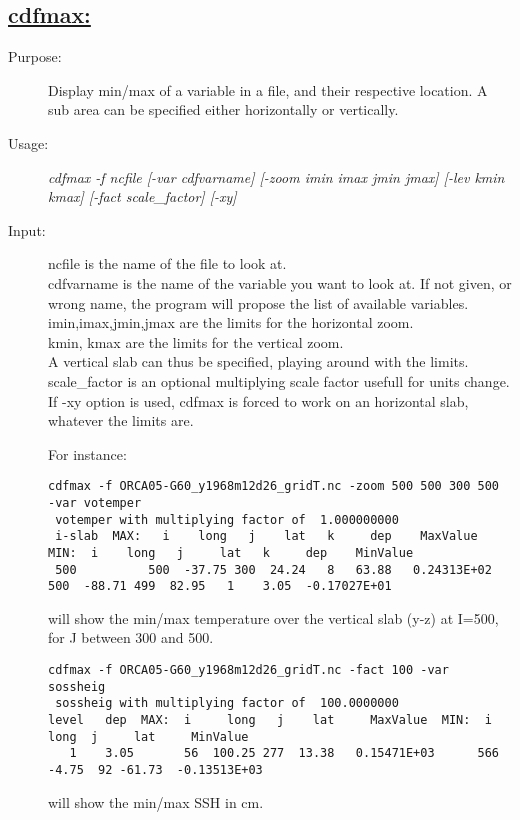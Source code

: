 \documentclass[a4paper,11pt]{article}
\begin{document}
\subsection*{\underline{cdfmax:}}
\begin{description}
\item[Purpose:] Display min/max of a variable in a file, and their respective location. A sub area can be specified either horizontally or vertically.
\item[Usage:] {\em cdfmax -f ncfile [-var cdfvarname] [-zoom imin imax jmin jmax] [-lev kmin kmax] [-fact scale\_factor] [-xy]}
\item[Input:] ncfile is the name of the file to look at. \\
      cdfvarname is the name of the variable you want to look at. If not given, or wrong name, the program will propose the list of
    available variables. \\
     imin,imax,jmin,jmax are the limits for the horizontal zoom.  \\
     kmin, kmax  are the limits for the vertical zoom. \\
     A vertical slab can thus be specified, playing around with the limits. \\
     scale\_factor is an optional multiplying scale factor usefull for units change. \\
     If -xy option is used, cdfmax is forced to work on an horizontal slab, whatever the limits are.

For instance: \\
\scriptsize{
\begin{verbatim}
cdfmax -f ORCA05-G60_y1968m12d26_gridT.nc -zoom 500 500 300 500 -var votemper
 votemper with multiplying factor of  1.000000000
 i-slab  MAX:   i    long   j    lat   k     dep    MaxValue    MIN:  i    long   j     lat   k     dep    MinValue
 500          500  -37.75 300  24.24   8   63.88   0.24313E+02       500  -88.71 499  82.95   1    3.05  -0.17027E+01
\end{verbatim} }
will  show the min/max temperature over the vertical slab (y-z)  at I=500, for J between 300 and 500.

\scriptsize{
\begin{verbatim}
cdfmax -f ORCA05-G60_y1968m12d26_gridT.nc -fact 100 -var sossheig
 sossheig with multiplying factor of  100.0000000
level   dep  MAX:  i     long   j    lat     MaxValue  MIN:  i     long  j     lat     MinValue
   1    3.05       56  100.25 277  13.38   0.15471E+03      566   -4.75  92 -61.73  -0.13513E+03
\end{verbatim} }
will show the min/max SSH in cm.


\end{description}
\end{document}
